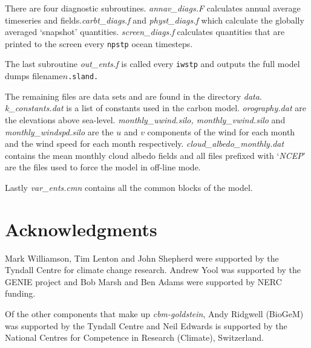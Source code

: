 \documentclass[10pt,a4paper]{report}
\begin{document}
There are four diagnostic subroutines. {\em annav\_diags.F}
calculates annual average timeseries and fields.{\em carbt\_diags.f}
and {\em physt\_diags.f} which calculate the globally averaged
`snapshot' quantities. {\em screen\_diags.f} calculates quantities
that are printed to the screen every {\tt npstp} ocean timesteps.

The last subroutine {\em out\_ents.f} is called every {\tt iwstp}
and outputs the full model dumps filename$n${\tt.sland.}

The remaining files are data sets and are found in the directory
{\em data}. {\em k\_constants.dat} is a list of constants used in
the carbon model. {\em orography.dat} are the elevations above
sea-level. {\em monthly\_uwind.silo, monthly\_vwind.silo} and {\em
monthly\_windspd.silo} are the $u$ and $v$ components of the wind
for each month and the wind speed for each month respectively.
{\em cloud\_albedo\_monthly.dat} contains the mean monthly cloud
albedo fields and all files prefixed with `{\em NCEP}' are the
files used to force the model in off-line mode.

Lastly {\em var\_ents.cmn} contains all the common blocks of the
model.

\chapter{Acknowledgments}

Mark Williamson, Tim Lenton and John Shepherd were supported by
the Tyndall Centre for climate change research. Andrew Yool was
supported by the GENIE project and Bob Marsh and Ben Adams were
supported by NERC funding.

Of the other components that make up {\em cbm-goldstein}, Andy
Ridgwell (BioGeM) was supported by the Tyndall Centre and Neil
Edwards is supported by the National Centres for Competence in
Research (Climate), Switzerland.
\end{document}
